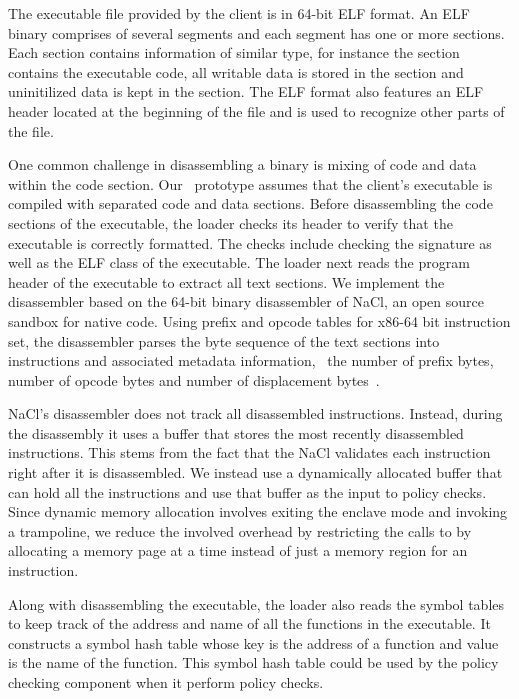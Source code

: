  The executable file provided by the client is
in 64-bit ELF format.  An ELF binary comprises of several segments and each
segment has one or more sections. Each section contains information of similar
type, for instance the  section contains the executable code, all
writable data is stored in the  section and uninitilized data is
kept in the  section. The ELF format also features an ELF header
located at the beginning of the file and is used to recognize other parts of
the file.

One common challenge in disassembling a binary is mixing of code and data
within the code section. Our \tool\ prototype assumes that the client's
executable is compiled with separated code and data sections. Before
disassembling the code sections of the executable, the loader checks its header
to verify that the executable is correctly formatted. The checks include
checking the signature as well as the ELF class of the executable. The loader
next reads the program header of the executable to extract all text sections.
We implement the disassembler based on the 64-bit binary disassembler of NaCl,
an open source sandbox for native code. Using prefix and opcode tables for
x86-64 bit instruction set, the disassembler parses the byte sequence of the
text sections into instructions and associated metadata
information, \eg~the number of prefix bytes, number of opcode bytes and number
of displacement bytes~\cite{intelinstructionset:june16}.

NaCl's disassembler  does not track all disassembled instructions. Instead,
during the disassembly it uses a buffer that stores the most recently
disassembled instructions. This stems from the fact that the NaCl validates
each instruction right after it is disassembled.  We instead use a dynamically
allocated buffer that can hold all the instructions and use that buffer as the
input to policy checks. Since dynamic memory allocation involves exiting the
enclave mode and invoking a trampoline, we reduce the involved overhead by
restricting the calls to  by allocating a memory page at a time
instead of just a memory region for an instruction.

Along with disassembling the executable, the loader also reads the symbol
tables to keep track of the address and name of all the functions in the
executable. It constructs a symbol hash table whose key is the address of a
function and value is the name of the function. This symbol hash table could be
used by the policy checking component when it perform policy checks.

